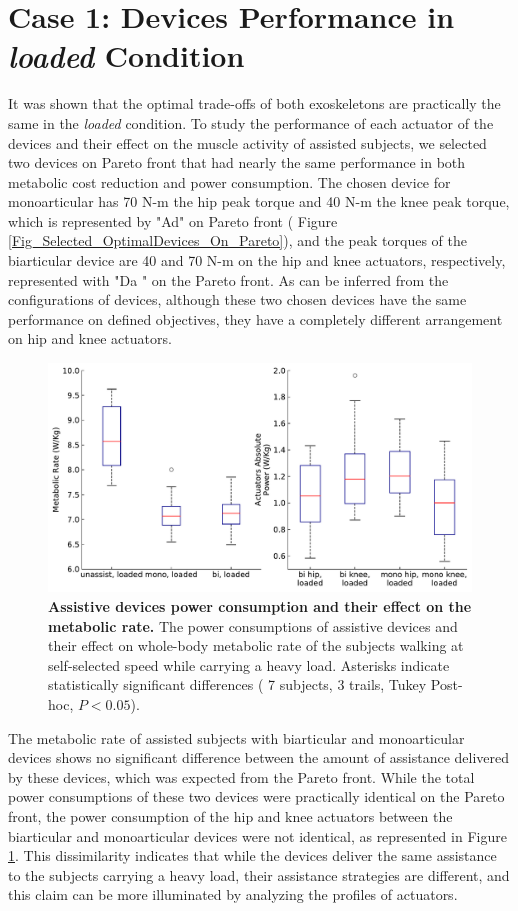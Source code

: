\documentclass[10pt,letterpaper]{article}
\begin{document}
\section*{Case 1: Devices Performance in \textit{loaded} Condition}
It was shown that the optimal trade-offs of both exoskeletons are practically the same in the {\it loaded} condition. To study the performance of each actuator of the devices and their effect on the muscle activity of assisted subjects, we selected two devices on Pareto front that had nearly the same performance in both metabolic cost reduction and power consumption. The chosen device for monoarticular has 70 N-m the hip peak torque and 40 N-m the knee peak torque, which is represented by "Ad" on Pareto front ( Figure \ref{Fig_Selected_OptimalDevices_On_Pareto}), and the peak torques of the biarticular device are 40 and 70 N-m on the hip and knee actuators, respectively, represented with "Da " on the Pareto front. As can be inferred from the configurations of devices, although these two chosen devices have the same performance on defined objectives, they have a completely different arrangement on hip and knee actuators.
\begin{figure}[ht]   
	\centering
	\includegraphics[width=\linewidth]{Case_Studies/LoadedMono04_LoadedBi16/PaperFigure_BoxPlot.pdf}
	\vspace{1mm}
	\caption{\small{\textbf{Assistive devices power consumption and their effect on the metabolic rate.} The power consumptions of assistive devices and their effect on whole-body metabolic rate of the subjects walking at self-selected speed while carrying a heavy load. Asterisks indicate statistically significant differences ( 7 subjects, 3 trails, Tukey Post-hoc, $P < 0.05$).}}
	\label{Fig_Case01_Energy_Plot}
\end{figure}
The metabolic rate of assisted subjects with biarticular and monoarticular devices shows no significant difference between the amount of assistance delivered by these devices, which was expected from the Pareto front. While the total power consumptions of these two devices were practically identical on the Pareto front, the power consumption of the hip and knee actuators between the biarticular and monoarticular devices were not identical, as represented in Figure \ref{Fig_Case01_Energy_Plot}. This dissimilarity indicates that while the devices deliver the same assistance to the subjects carrying a heavy load, their assistance strategies are different, and this claim can be more illuminated by analyzing the profiles of actuators.\\
\end{document}
